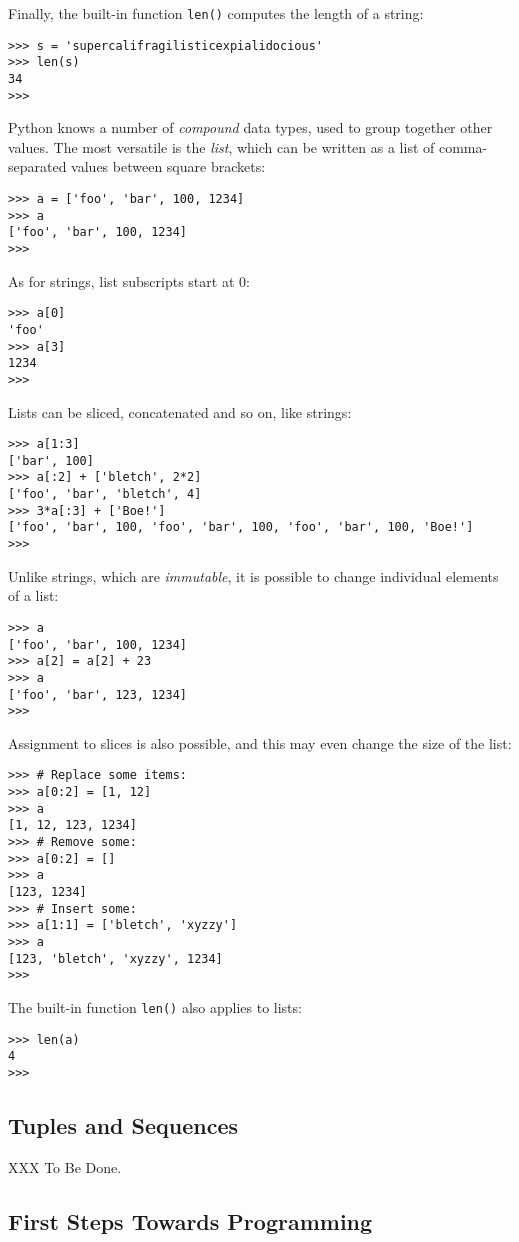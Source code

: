 Finally, the built-in function {\tt len()} computes the length of a
string:
\bcode\begin{verbatim}
>>> s = 'supercalifragilisticexpialidocious'
>>> len(s)
34
>>> 
\end{verbatim}\ecode
Python knows a number of
{\em compound}
data types, used to group together other values.
The most versatile is the
{\em list},
which can be written as a list of comma-separated values between square
brackets:
\bcode\begin{verbatim}
>>> a = ['foo', 'bar', 100, 1234]
>>> a
['foo', 'bar', 100, 1234]
>>> 
\end{verbatim}\ecode
As for strings, list subscripts start at 0:
\bcode\begin{verbatim}
>>> a[0]
'foo'
>>> a[3]
1234
>>> 
\end{verbatim}\ecode
Lists can be sliced, concatenated and so on, like strings:
\bcode\begin{verbatim}
>>> a[1:3]
['bar', 100]
>>> a[:2] + ['bletch', 2*2]
['foo', 'bar', 'bletch', 4]
>>> 3*a[:3] + ['Boe!']
['foo', 'bar', 100, 'foo', 'bar', 100, 'foo', 'bar', 100, 'Boe!']
>>> 
\end{verbatim}\ecode
Unlike strings, which are
{\em immutable},
it is possible to change individual elements of a list:
\bcode\begin{verbatim}
>>> a
['foo', 'bar', 100, 1234]
>>> a[2] = a[2] + 23
>>> a
['foo', 'bar', 123, 1234]
>>>
\end{verbatim}\ecode
Assignment to slices is also possible, and this may even change the size
of the list:
\bcode\begin{verbatim}
>>> # Replace some items:
>>> a[0:2] = [1, 12]
>>> a
[1, 12, 123, 1234]
>>> # Remove some:
>>> a[0:2] = []
>>> a
[123, 1234]
>>> # Insert some:
>>> a[1:1] = ['bletch', 'xyzzy']
>>> a
[123, 'bletch', 'xyzzy', 1234]
>>> 
\end{verbatim}\ecode
The built-in function {\tt len()} also applies to lists:
\bcode\begin{verbatim}
>>> len(a)
4
>>> 
\end{verbatim}\ecode

\subsection{Tuples and Sequences}

XXX To Be Done.

\subsection{First Steps Towards Programming}

